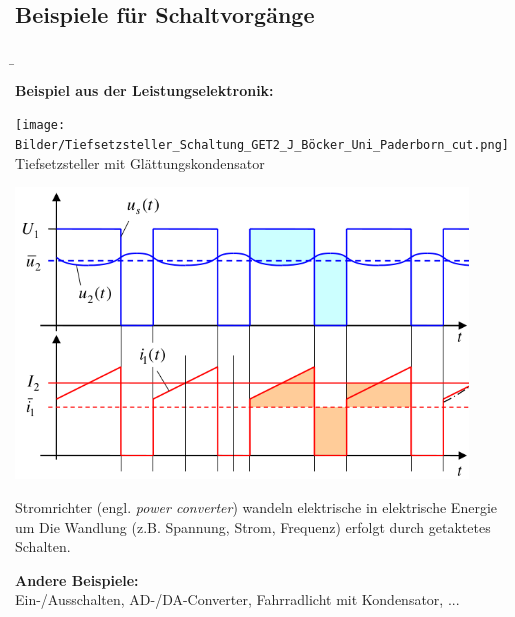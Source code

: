 
\subsection{Beispiele für Schaltvorgänge}
\label{sec:einfuehrung:beispieleschaltvorgaenge}
\begin{frame}\ftx{\subsecname}
\b{%
\textbf{Beispiel aus der Leistungselektronik:} 

\begin{minipage}{0.38\textwidth}\centering
	\texttt{[image: Bilder/Tiefsetzsteller\_Schaltung\_GET2\_J\_Böcker\_Uni\_Paderborn\_cut.png]}
	Tiefsetzsteller mit Glättungskondensator\footnotemark
\end{minipage}%
\begin{minipage}{0.58\textwidth}\centering
	\includegraphics[width=0.9\textwidth]{Bilder/Tiefsetzsteller_Zeitverläufe_GET2_J_Böcker_Uni_Paderborn_cut_edit.png}
\end{minipage}

Stromrichter (engl. \textit{power converter}) wandeln elektrische in elektrische Energie um 
Die Wandlung (z.B. Spannung, Strom, Frequenz) erfolgt durch getaktetes Schalten.\vspace{5pt}

\textbf{Andere Beispiele:}\\
Ein-/Ausschalten, AD-/DA-Converter, Fahrradlicht mit Kondensator, ...
}%
\end{frame}
